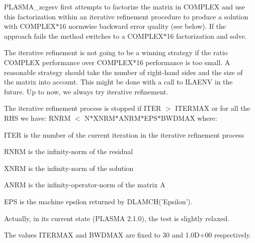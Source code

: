 PLASMA\_\-zcgesv first attempts to factorize the matrix in COMPLEX and use this factorization within an iterative refinement procedure to produce a solution with COMPLEX$\ast$16 normwise backward error quality (see below). If the approach fails the method switches to a COMPLEX$\ast$16 factorization and solve.

The iterative refinement is not going to be a winning strategy if the ratio COMPLEX performance over COMPLEX$\ast$16 performance is too small. A reasonable strategy should take the number of right-\/hand sides and the size of the matrix into account. This might be done with a call to ILAENV in the future. Up to now, we always try iterative refinement.

The iterative refinement process is stopped if ITER $>$ ITERMAX or for all the RHS we have: RNRM $<$ N$\ast$XNRM$\ast$ANRM$\ast$EPS$\ast$BWDMAX where:


\begin{DoxyItemize}
\item ITER is the number of the current iteration in the iterative refinement process
\item RNRM is the infinity-\/norm of the residual
\item XNRM is the infinity-\/norm of the solution
\item ANRM is the infinity-\/operator-\/norm of the matrix A
\item EPS is the machine epsilon returned by DLAMCH('Epsilon').
\end{DoxyItemize}

Actually, in its current state (PLASMA 2.1.0), the test is slightly relaxed.

The values ITERMAX and BWDMAX are fixed to 30 and 1.0D+00 respectively.


